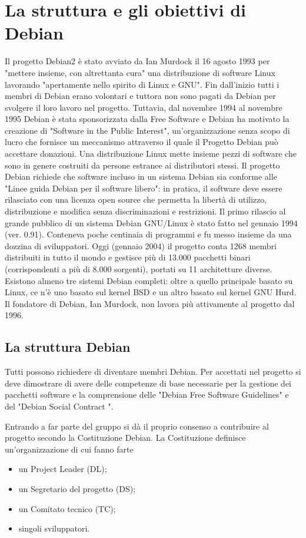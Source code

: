 \documentclass[a4paper,12pt,titlepage,oneside]{book}
\begin{document}
\section{La struttura e gli obiettivi di Debian}
    Il progetto Debian2 è stato avviato da Ian Murdock il 16 agosto 1993 per "mettere insieme, con altrettanta cura" una distribuzione di software Linux lavorando
    "apertamente nello spirito di Linux e GNU". Fin dall'inizio tutti i membri di Debian erano volontari
    e tuttora non sono pagati da Debian per svolgere il loro lavoro nel progetto. Tuttavia, dal novembre 
    1994 al novembre 1995 Debian è stata sponsorizzata dalla Free Software
    e Debian ha motivato la creazione di "Software in the Public Interest", un'organizzazione senza scopo 
    di lucro che fornisce un meccanismo attraverso il quale il Progetto Debian può accettare donazioni. 
    Una distribuzione Linux mette insieme pezzi di software che sono in genere costruiti da persone estranee ai distributori stessi.
    Il progetto Debian richiede che software incluso in un sistema Debian sia conforme alle "Linee guida Debian per il software libero": in pratica, il software
    deve essere rilasciato con una licenza open source che permetta la libertà di utilizzo, distribuzione e modifica senza discriminazioni e restrizioni.
    Il primo rilascio al grande pubblico di un sistema Debian GNU/Linux è stato fatto nel gennaio 1994 (ver. 0.91). Conteneva poche centinaia di programmi 
    e fu messo insieme da una dozzina di sviluppatori. Oggi (gennaio 2004) il progetto conta 1268 
    membri distribuiti in tutto il mondo e gestisce più di 13.000 pacchetti binari 
    (corrispondenti a più di 8.000 sorgenti), portati su 11 architetture diverse. Esistono almeno tre sistemi Debian completi: 
    oltre a quello principale basato su Linux, ce n'è uno basato sul kernel BSD e un altro basato sul kernel GNU Hurd.
    Il fondatore di Debian, Ian Murdock, non lavora più attivamente al progetto dal 1996.

    \subsection{La struttura Debian}
    Tutti possono richiedere di diventare membri Debian. Per accettati nel progetto si deve dimostrare di
    avere delle competenze di base necessarie per la gestione dei pacchetti
    software e la comprensione delle "Debian Free Software Guidelines" e del "Debian Social Contract ".

    Entrando a far parte del gruppo si dà il proprio consenso a contribuire al progetto secondo la Costituzione Debian. La Costituzione definisce un'organizzazione
    di cui fanno farte 
    \begin{itemize}
        \item un Project Leader (DL);
        \item un Segretario del progetto (DS);
        \item un Comitato tecnico (TC);
        \item singoli sviluppatori.
    \end{itemize}
    
\end{document}
